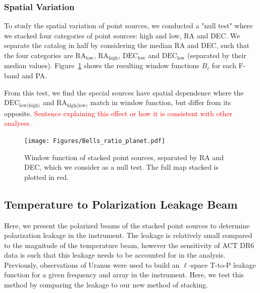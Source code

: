 \subsubsection{Spatial Variation}
\label{subsubsec:null_mainbeam}

To study the spatial variation of point sources, we conducted a "null test" where we stacked four categories of point sources: high and low, RA and DEC.  We separate the catalog in half by considering the median RA and DEC, such that the four categories are $\text{RA}_{\text{low}}$, $\text{RA}_{\text{high}}$, $\text{DEC}_{\text{low}}$ and $\text{DEC}_{\text{low}}$ (separated by their median values). 
 Figure~\ref{fig:bells} shows the resulting window functions $B_{\ell}$ for each F-band and PA.

From this test, we find the special sources have spatial dependence where the $\text{DEC}_{\text{low(high)}}$ and $\text{RA}_{\text{high(low)}}$ match in window function, but differ from its opposite.  \textcolor{red}{Sentence explaining this effect or how it is consistent with other analyses.}

\begin{figure}
    \centering
    \texttt{[image: Figures/Bells\_ratio\_planet.pdf]}
    \caption{Window function of stacked point sources, separated by RA and DEC, which we consider as a null test.  The full map stacked is plotted in red.}
    \label{fig:bells}
\end{figure}

\subsection{Temperature to Polarization Leakage Beam}
\label{subsec:polbeam}

Here, we present the polarized beams of the stacked point sources to determine polarization leakage in the instrument.  The leakage is relatively small compared to the magnitude of the temperature beam, however the sensitivity of ACT DR6 data is such that this leakage needs to be accounted for in the analysis.  Previously, observations of Uranus were used to build an $\ell$-space T-to-P leakage function for a given frequency and array in the instrument.  Here, we test this method by comparing the leakage to our new method of stacking.

